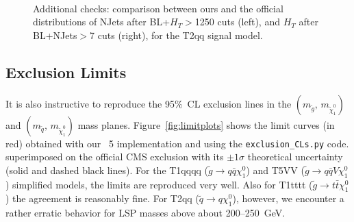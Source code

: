         \begin{figure}
        \centering
        \hspace{-1 cm}
        ~ %
        \caption{Additional checks: comparison between ours and the official distributions of NJets after BL+$H_T$$>$1250 cuts (left), and $H_T$ after BL+NJets$>$7 cuts (right), for the T2qq signal model.}
        \label{fig:last}
        \end{figure} 
        
        
\clearpage
\subsection{Exclusion Limits}

It is also instructive to reproduce the 95\%~CL exclusion lines in the $(m_{\tilde g},\,m_{\tilde\chi^0_1})$ 
and $(m_{\tilde q},\,m_{\tilde\chi^0_1})$ mass planes.  
Figure~\ref{fig:limitplots}  shows the limit curves (in red) obtained with our 
{}~5 implementation and using the {\tt{exclusion\_CLs.py}} code.
superimposed on the official CMS exclusion with its $\pm 1\sigma$ theoretical uncertainty (solid and dashed black lines).  For the T1qqqq ($\tilde{g}\to q\bar{q}\chi_{1}^{0}$) and T5VV ($\tilde{g} \to q\bar{q}V\chi_{1}^{0}$) simplified models, the limits are reproduced very well. 
Also for T1tttt ($\tilde{g}\to t\bar{t}\chi_{1}^{0}$) the agreement is reasonably fine. 
For T2qq ($\tilde{q}\to q \chi_{1}^{0} $), however, we encounter a rather erratic behavior for 
LSP masses above about 200--250~GeV.

